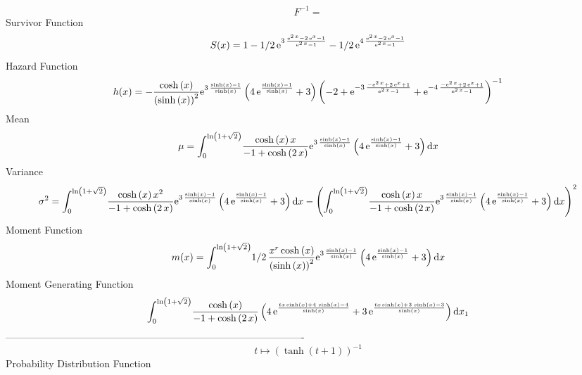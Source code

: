 \documentclass[12pt]{article}
\begin{document}
  $$F^{-1} = $$Survivor Function 
 $$ S(x)=1-1/2\,{{\rm e}^{3\,{\frac {{{\rm e}^{2\,x}}-2\,{{\rm e}^{x}}-1}{{
{\rm e}^{2\,x}}-1}}}}-1/2\,{{\rm e}^{4\,{\frac {{{\rm e}^{2\,x}}-2\,{
{\rm e}^{x}}-1}{{{\rm e}^{2\,x}}-1}}}}
$$ Hazard Function 
 $$ h(x)=-{\frac {\cosh \left( x \right) }{ \left( \sinh \left( x \right) 
 \right) ^{2}}{{\rm e}^{3\,{\frac {\sinh \left( x \right) -1}{\sinh
 \left( x \right) }}}} \left( 4\,{{\rm e}^{{\frac {\sinh \left( x
 \right) -1}{\sinh \left( x \right) }}}}+3 \right)  \left( -2+{{\rm e}
^{-3\,{\frac {-{{\rm e}^{2\,x}}+2\,{{\rm e}^{x}}+1}{{{\rm e}^{2\,x}}-1
}}}}+{{\rm e}^{-4\,{\frac {-{{\rm e}^{2\,x}}+2\,{{\rm e}^{x}}+1}{{
{\rm e}^{2\,x}}-1}}}} \right) ^{-1}}
$$Mean 
 $$ \mu=\int_{0}^{\ln  \left( 1+\sqrt {2} \right) }\!{\frac {\cosh \left( x
 \right) x}{-1+\cosh \left( 2\,x \right) }{{\rm e}^{3\,{\frac {\sinh
 \left( x \right) -1}{\sinh \left( x \right) }}}} \left( 4\,{{\rm e}^{
{\frac {\sinh \left( x \right) -1}{\sinh \left( x \right) }}}}+3
 \right) }\,{\rm d}x
$$ Variance 
 $$ \sigma^2 = \int_{0}^{\ln  \left( 1+\sqrt {2} \right) }\!{\frac {\cosh \left( x
 \right) {x}^{2}}{-1+\cosh \left( 2\,x \right) }{{\rm e}^{3\,{\frac {
\sinh \left( x \right) -1}{\sinh \left( x \right) }}}} \left( 4\,{
{\rm e}^{{\frac {\sinh \left( x \right) -1}{\sinh \left( x \right) }}}
}+3 \right) }\,{\rm d}x- \left( \int_{0}^{\ln  \left( 1+\sqrt {2}
 \right) }\!{\frac {\cosh \left( x \right) x}{-1+\cosh \left( 2\,x
 \right) }{{\rm e}^{3\,{\frac {\sinh \left( x \right) -1}{\sinh
 \left( x \right) }}}} \left( 4\,{{\rm e}^{{\frac {\sinh \left( x
 \right) -1}{\sinh \left( x \right) }}}}+3 \right) }\,{\rm d}x
 \right) ^{2}
$$Moment Function 
 $$ m(x) = \int_{0}^{\ln  \left( 1+\sqrt {2} \right) }\!1/2\,{\frac {{x}^{r}\cosh
 \left( x \right) }{ \left( \sinh \left( x \right)  \right) ^{2}}{
{\rm e}^{3\,{\frac {\sinh \left( x \right) -1}{\sinh \left( x \right) 
}}}} \left( 4\,{{\rm e}^{{\frac {\sinh \left( x \right) -1}{\sinh
 \left( x \right) }}}}+3 \right) }\,{\rm d}x
$$ Moment Generating Function 
 $$\int_{0}^{\ln  \left( 1+\sqrt {2} \right) }\!{\frac {\cosh \left( x
 \right) }{-1+\cosh \left( 2\,x \right) } \left( 4\,{{\rm e}^{{\frac {
tx\sinh \left( x \right) +4\,\sinh \left( x \right) -4}{\sinh \left( x
 \right) }}}}+3\,{{\rm e}^{{\frac {tx\sinh \left( x \right) +3\,\sinh
 \left( x \right) -3}{\sinh \left( x \right) }}}} \right) }\,{\rm d}x_
{{1}}
$$-------------------------------------------------------------------------------------------  \\$$t\mapsto  \left( \tanh \left( t+1 \right)  \right) ^{-1}
$$Probability Distribution Function 
\end{document}

